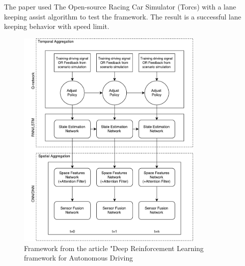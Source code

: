 The paper used The Open-source Racing Car Simulator (Torcs) with a lane keeping assist algorithm to test the framework. The result is a successful lane keeping behavior with speed limit.    

\begin{figure}[H]
	\centering
	\includegraphics[width=0.8\textwidth]{Figures/TheoreticalBackground/Framework_article}
	\caption{Framework from the article "Deep Reinforcement Learning framework for Autonomous Driving}
	\label{fig:Framework_article}
\end{figure}
 